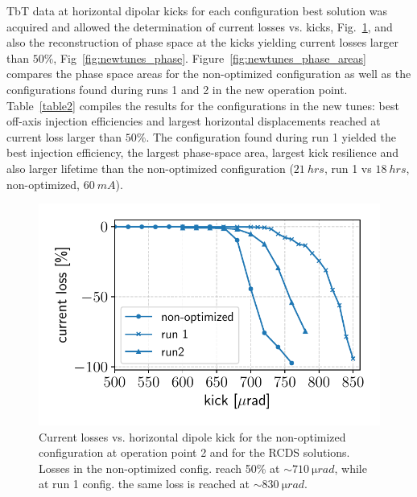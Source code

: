 \documentclass[a4paper,
               keeplastbox,   %
               ]{jacow}
\begin{document}
TbT data at horizontal dipolar kicks for each configuration best solution was acquired and allowed the determination of current losses vs. kicks, Fig.~\ref{fig:loss_kicks_newtunes}, and also the reconstruction of phase space at the kicks yielding current losses larger than $50\%$, Fig~\ref{fig:newtunes_phase}. Figure~\ref{fig:newtunes_phase_areas} compares the phase space areas for the non-optimized configuration as well as the configurations found during runs 1 and 2 in the new operation point. Table~\ref{table2} compiles the results for the configurations in the new tunes: best off-axis injection efficiencies and largest horizontal displacements reached at current loss larger than $50\%$. The configuration found during run 1 yielded the best injection efficiency, the largest phase-space area, largest kick resilience and also larger lifetime than the non-optimized configuration ($21~\unit{hrs}$, run 1 vs $18~\unit{hrs}$, non-optimized, $60~\unit{mA}$). 
\begin{figure}[!h]
   \includegraphics[width=\columnwidth]{new_tunes_kick_resilience.pdf}
   \caption{Current losses vs. horizontal dipole kick for the non-optimized configuration at operation point 2 and for the RCDS solutions. Losses in the non-optimized config. reach 50\% at $\sim710~\si{\micro rad}$, while at run 1 config. the same loss is reached at $\sim 830~\si{\micro rad}$.}
   \label{fig:loss_kicks_newtunes}
\end{figure}
\end{document}
